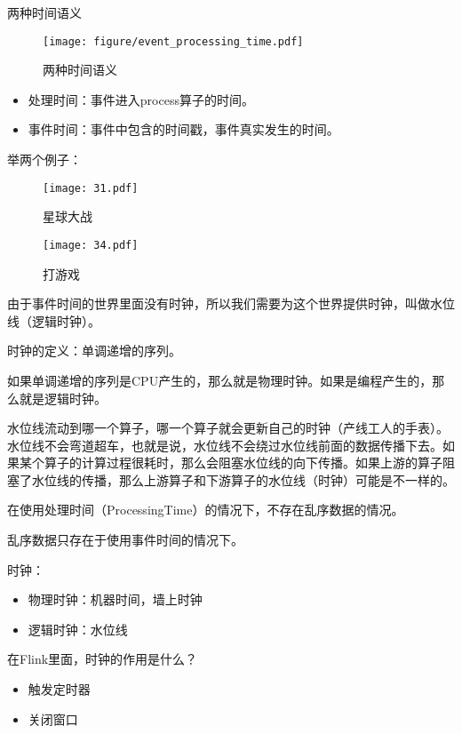 \documentclass[cn,11pt,chinese]{elegantbook}
\begin{document}
两种时间语义

\begin{figure}[htbp]
  \centering
  \texttt{[image: figure/event\_processing\_time.pdf]}
  \caption{两种时间语义}
\end{figure}

\begin{itemize}
  \item 处理时间：事件进入process算子的时间。
  \item 事件时间：事件中包含的时间戳，事件真实发生的时间。
\end{itemize}

举两个例子：

\begin{figure}[htbp]
  \centering
  \texttt{[image: 31.pdf]}
  \caption{星球大战}
\end{figure}

\clearpage
\begin{figure}[htbp]
  \centering
  \texttt{[image: 34.pdf]}
  \caption{打游戏}
\end{figure}

由于事件时间的世界里面没有时钟，所以我们需要为这个世界提供时钟，叫做水位线（逻辑时钟）。

时钟的定义：单调递增的序列。

如果单调递增的序列是CPU产生的，那么就是物理时钟。如果是编程产生的，那么就是逻辑时钟。

水位线流动到哪一个算子，哪一个算子就会更新自己的时钟（产线工人的手表）。水位线不会弯道超车，也就是说，水位线不会绕过水位线前面的数据传播下去。如果某个算子的计算过程很耗时，那么会阻塞水位线的向下传播。如果上游的算子阻塞了水位线的传播，那么上游算子和下游算子的水位线（时钟）可能是不一样的。

在使用处理时间（ProcessingTime）的情况下，不存在乱序数据的情况。

乱序数据只存在于使用事件时间的情况下。

时钟：

\begin{itemize}
  \item 物理时钟：机器时间，墙上时钟
  \item 逻辑时钟：水位线
\end{itemize}

在Flink里面，时钟的作用是什么？

\begin{itemize}
  \item 触发定时器
  \item 关闭窗口
\end{itemize}
\end{document}
